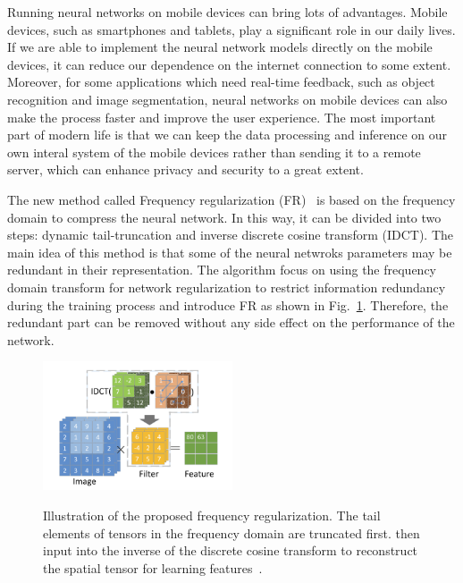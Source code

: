 \documentclass[UTF8]{article}
\begin{document}
Running neural networks on mobile devices can bring lots of advantages. Mobile devices, such as smartphones and tablets, play a significant role in our daily lives. If we are able to implement the neural network models directly on the mobile devices, it can reduce our dependence on the internet connection to some extent. Moreover, for some applications which need real-time feedback, such as object recognition and image segmentation, neural networks on mobile devices can also make the process faster and improve the user experience. The most important part of modern life is that we can keep the data processing and inference on our own interal system of the mobile devices rather than sending it to a remote server, which can enhance privacy and security to a great extent.

The new method called Frequency regularization (FR)~\cite{zhao2023frequency} is based on the frequency domain to compress the neural network. In this way, it can be divided into two steps: dynamic tail-truncation and inverse discrete cosine transform (IDCT). The main idea of this method is that some of the neural netwroks parameters may be redundant in their representation. The algorithm focus on using the frequency domain transform for network regularization to restrict information redundancy during the training process and introduce FR as shown in Fig.~\ref{idct}. Therefore, the redundant part can be removed without any side effect on the performance of the network.

\begin{figure}
	\vspace{-15pt}    %
	\includegraphics[width=0.5\textwidth]{figure/idct.png}\\
	\vspace{-15pt}    %
	\caption{Illustration of the proposed frequency regularization. The tail elements of tensors in the frequency domain are truncated first. then input into the inverse of the discrete cosine transform to reconstruct the spatial tensor for learning features~\cite{zhao2023frequency}.}
	\label{idct}
	\vspace{-15pt}    %
\end{figure}
\end{document}
